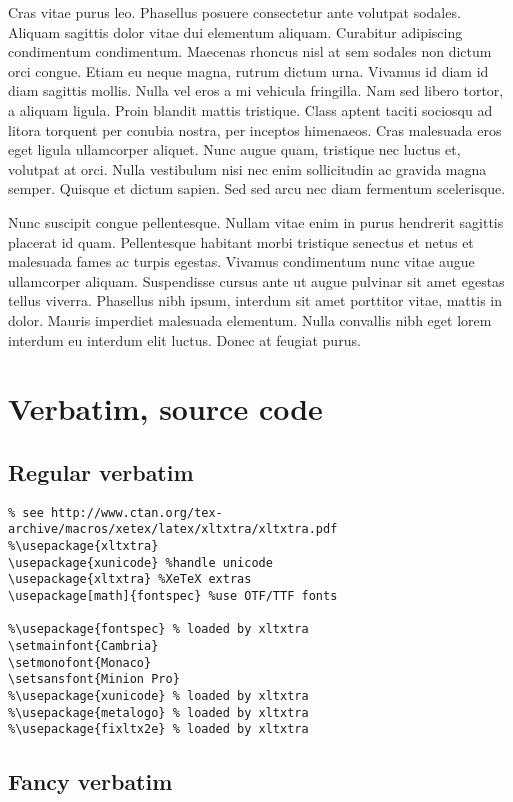 \documentclass[draft=false]{book}
\begin{document}
Cras vitae purus leo. Phasellus posuere consectetur ante volutpat sodales. Aliquam sagittis dolor vitae dui elementum aliquam. Curabitur adipiscing condimentum condimentum. Maecenas rhoncus nisl at sem sodales non dictum orci congue. Etiam eu neque magna, rutrum dictum urna. Vivamus id diam id diam sagittis mollis. Nulla vel eros a mi vehicula fringilla. Nam sed libero tortor, a aliquam ligula. Proin blandit mattis tristique. Class aptent taciti sociosqu ad litora torquent per conubia nostra, per inceptos himenaeos. Cras malesuada eros eget ligula ullamcorper aliquet. Nunc augue quam, tristique nec luctus et, volutpat at orci. Nulla vestibulum nisi nec enim sollicitudin ac gravida magna semper. Quisque et dictum sapien. Sed sed arcu nec diam fermentum scelerisque.

Nunc suscipit congue pellentesque. Nullam vitae enim in purus hendrerit sagittis placerat id quam. Pellentesque habitant morbi tristique senectus et netus et malesuada fames ac turpis egestas. Vivamus condimentum nunc vitae augue ullamcorper aliquam. Suspendisse cursus ante ut augue pulvinar sit amet egestas tellus viverra. Phasellus nibh ipsum, interdum sit amet porttitor vitae, mattis in dolor. Mauris imperdiet malesuada elementum. Nulla convallis nibh eget lorem interdum eu interdum elit luctus. Donec at feugiat purus. 

\section{Verbatim, source code}

\subsection{Regular verbatim}

\begin{verbatim}
% see http://www.ctan.org/tex-archive/macros/xetex/latex/xltxtra/xltxtra.pdf
%\usepackage{xltxtra} 
\usepackage{xunicode} %handle unicode
\usepackage{xltxtra} %XeTeX extras
\usepackage[math]{fontspec} %use OTF/TTF fonts

%\usepackage{fontspec} % loaded by xltxtra
\setmainfont{Cambria}
\setmonofont{Monaco}
\setsansfont{Minion Pro}
%\usepackage{xunicode} % loaded by xltxtra
%\usepackage{metalogo} % loaded by xltxtra
%\usepackage{fixltx2e} % loaded by xltxtra
\end{verbatim}

\subsection{Fancy verbatim}
\end{document}
